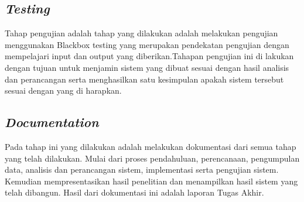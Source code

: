 \subsection{\textit{Testing}}
Tahap pengujian adalah  tahap yang dilakukan adalah melakukan pengujian menggunakan Blackbox testing yang merupakan pendekatan pengujian dengan mempelajari input dan output yang diberikan.Tahapan pengujian ini di lakukan dengan tujuan untuk menjamin sistem yang dibuat sesuai dengan hasil analisis dan perancangan serta menghasilkan satu kesimpulan apakah sistem tersebut sesuai dengan yang di harapkan.

\subsection{\textit{Documentation}}
Pada tahap ini yang dilakukan adalah melakukan dokumentasi dari semua tahap yang telah dilakukan. Mulai dari proses pendahuluan, perencanaan, pengumpulan data, analisis dan perancangan sistem, implementasi serta pengujian sistem. Kemudian mempresentasikan hasil penelitian dan menampilkan hasil sistem yang telah dibangun. Hasil dari dokumentasi ini adalah laporan Tugas Akhir.
